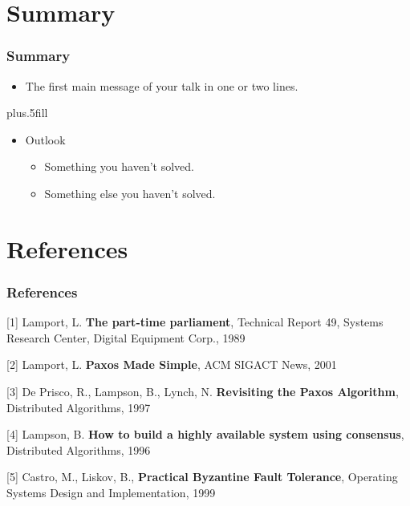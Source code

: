 \documentclass[10 pt]{beamer}
\begin{document}
\section*{Summary}


\begin{frame}
\frametitle<presentation>{Summary}

\begin{itemize}
  \item The \alert{first main message} of your talk in one or two lines.
\end{itemize}

\vskip0pt plus.5fill
\begin{itemize}
  \item Outlook
  \begin{itemize}
    \item Something you haven't solved.
    \item Something else you haven't solved.
  \end{itemize}
\end{itemize}

\end{frame}



\section*{References}


\begin{frame}
  \frametitle{References}

[1] Lamport, L. \textbf{The part-time parliament}, Technical Report 49, Systems Research Center, Digital Equipment Corp., 1989
\vspace{4 mm}

[2] Lamport, L. \textbf{Paxos Made Simple}, ACM SIGACT News, 2001
\vspace{4 mm}

[3] De Prisco, R., Lampson, B., Lynch, N. \textbf{Revisiting the Paxos Algorithm}, Distributed Algorithms, 1997
\vspace{4 mm}

[4] Lampson, B. \textbf{How to build a highly available system using consensus}, Distributed Algorithms, 1996
\vspace{4 mm}

[5] Castro, M., Liskov, B., \textbf{Practical Byzantine Fault Tolerance}, Operating Systems Design and Implementation, 1999
  
\end{frame}
\end{document}
